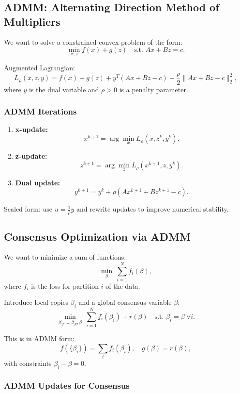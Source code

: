 \documentclass[11pt]{article}
\begin{document}
\subsection{ADMM: Alternating Direction Method of Multipliers}

We want to solve a constrained convex problem of the form:
\[
    \min_{x,z} f(x) + g(z) \quad \text{s.t. } Ax + Bz = c.
\]

Augmented Lagrangian:
\[
    L_\rho(x, z, y) = f(x) + g(z) + y^T(Ax + Bz - c) + \frac{\rho}{2}\|Ax + Bz - c\|_2^2,
\]
where $y$ is the dual variable and $\rho > 0$ is a penalty parameter.

\subsubsection*{ADMM Iterations}

\begin{enumerate}
    \item \textbf{x-update:}
    \[
        x^{k+1} = \arg\min_x L_\rho(x, z^k, y^k).
    \]
    \item \textbf{z-update:}
    \[
        z^{k+1} = \arg\min_z L_\rho(x^{k+1}, z, y^k).
    \]
    \item \textbf{Dual update:}
    \[
        y^{k+1} = y^k + \rho (A x^{k+1} + B z^{k+1} - c).
    \]
\end{enumerate}

Scaled form: use $u = \frac{1}{\rho}y$ and rewrite updates to improve numerical stability.

\subsection{Consensus Optimization via ADMM}

We want to minimize a sum of functions:
\[
    \min_\beta \ \sum_{i=1}^N f_i(\beta),
\]
where $f_i$ is the loss for partition $i$ of the data.

Introduce local copies $\beta_i$ and a global consensus variable $\beta$:
\[
    \min_{\beta_1,\dots,\beta_N,\beta} \ \sum_{i=1}^N f_i(\beta_i) + r(\beta)\quad \text{s.t. } \beta_i = \beta \ \forall i.
\]

This is in ADMM form:
\[
    f(\{\beta_i\}) = \sum_i f_i(\beta_i),\quad g(\beta) = r(\beta),
\]
with constraints $\beta_i - \beta = 0$.

\subsubsection*{ADMM Updates for Consensus}
\end{document}

